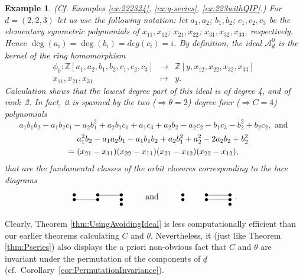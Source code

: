 \documentclass[a4paper]{amsart}
\newcommand{\Z}{\mathbb{Z}}
\newcommand{\CA}{\mathcal{A}}
\newcommand{\ud}{\underline{d}}
\theoremstyle{plain}
\newtheorem{example}[thm]{Example}
\begin{document}
\begin{example}\rm (Cf. Examples \ref{ex:222324}, \ref{ex:q-series}, \ref{ex:223withQIP}.)
For $\ud=(2,2,3)$ let us use the following notation: let $a_1,a_2$; $b_1,b_2$; $c_1,c_2,c_3$ be the elementary symmetric polynomials of $x_{11},x_{12}$; $x_{21},x_{22}$; $x_{31},x_{32},x_{33}$, respectively. Hence $\deg(a_i)=\deg(b_i)=deg(c_i)=i$. By definition, the ideal $\CA^0_{\ud}$ is the kernel of the ring homomorphism
\[
\begin{array}{rcl}
    \phi_0:\Z[a_1,a_2,b_1,b_2,c_1,c_2,c_3] & \to & \Z[y,x_{12},x_{22},x_{32}, x_{33}] \\
    x_{11}, x_{21}, x_{31} & \mapsto & y.
\end{array}
\] 
Calculation shows that the lowest degree part of this ideal is of degree 4, and of rank~2. In fact, it is spanned by the {\em two} ($\Rightarrow \theta=2$) degree {\em four} ($\Rightarrow C=4$) polynomials
\[
    a_1b_1b_2 - a_1b_2c_1 - a_2b_1^2 + a_2b_1c_1 + a_1c_3 + a_2b_2 - a_2c_2 - b_1c_3 - b_2^2 + b_2c_2,\text{   and}
\]
\begin{multline*}
    \hskip .8 true cm a_1^2b_2 - a_1a_2b_1 - a_1b_1b_2 + a_2b_1^2 + a_2^2 - 2a_2b_2 + b_2^2 \\
    =(x_{21}-x_{11})(x_{22}-x_{11})(x_{21}-x_{12})(x_{22}-x_{12}),
\end{multline*}
that are the fundamental classes of the orbit closures corresponding to the lace diagrams
\begin{equation*} 
    \begin{tikzpicture}[baseline=-5]
 \node at (0,0)  {$\bullet$};
 \node at (0,-.2)  {$\bullet$};
 \node at (1,0)  {$\bullet$};
 \node at (1,-.2)  {$\bullet$};
 \node at (2,0)  {$\bullet$};
 \node at (2,-.2)  {$\bullet$};
 \node at (2,-.4)  {$\bullet$};
  \draw (1,0) -- (2,0);
  \draw (0,-.2)--(1,-.2);
\end{tikzpicture}
\qquad \text{ and }\qquad
\begin{tikzpicture}[baseline=-5]
 \node at (0,0)  {$\bullet$};
 \node at (0,-.2)  {$\bullet$};
 \node at (1,0)  {$\bullet$};
 \node at (1,-.2)  {$\bullet$};
 \node at (2,0)  {$\bullet$};
 \node at (2,-.2)  {$\bullet$};
 \node at (2,-.4)  {$\bullet$};
  \draw (1,0) -- (2,0);
  \draw (1,-.2)--(2,-.2);
\end{tikzpicture}.
\end{equation*}
\end{example}

Clearly, Theorem \ref{thm:UsingAvoidingIdeal} is less computationally efficient than our earlier theorems calculating $C$ and $\theta$. Nevertheless, it (just like Theorem \ref{thm:Pseries}) also displays the a priori non-obvious fact that $C$ and $\theta$ are invariant under the permutation of the components of $\ud$ (cf.~Corollary~\ref{cor:PermutationInvariance}). 




\end{document}
